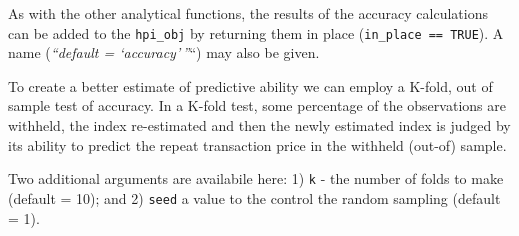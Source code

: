 \documentclass[]{article}
\newenvironment{Shaded}{\begin{snugshade}}{\end{snugshade}}
\newcommand{\KeywordTok}[1]{\textcolor[rgb]{0.13,0.29,0.53}{\textbf{#1}}}
\newcommand{\DataTypeTok}[1]{\textcolor[rgb]{0.13,0.29,0.53}{#1}}
\newcommand{\StringTok}[1]{\textcolor[rgb]{0.31,0.60,0.02}{#1}}
\newcommand{\CommentTok}[1]{\textcolor[rgb]{0.56,0.35,0.01}{\textit{#1}}}
\newcommand{\OtherTok}[1]{\textcolor[rgb]{0.56,0.35,0.01}{#1}}
\newcommand{\OperatorTok}[1]{\textcolor[rgb]{0.81,0.36,0.00}{\textbf{#1}}}
\newcommand{\NormalTok}[1]{#1}
\begin{document}
As with the other analytical functions, the results of the accuracy
calculations can be added to the \texttt{hpi\_obj} by returning them in
place (\texttt{in\_place\ ==\ TRUE}). A name (\emph{``default =
`accuracy'\,''}``) may also be given.

\begin{Shaded}
\end{Shaded}

To create a better estimate of predictive ability we can employ a
K-fold, out of sample test of accuracy. In a K-fold test, some
percentage of the observations are withheld, the index re-estimated and
then the newly estimated index is judged by its ability to predict the
repeat transaction price in the withheld (out-of) sample.

Two additional arguments are availabile here: 1) \texttt{k} - the number
of folds to make (default = 10); and 2) \texttt{seed} a value to the
control the random sampling (default = 1).
\end{document}
